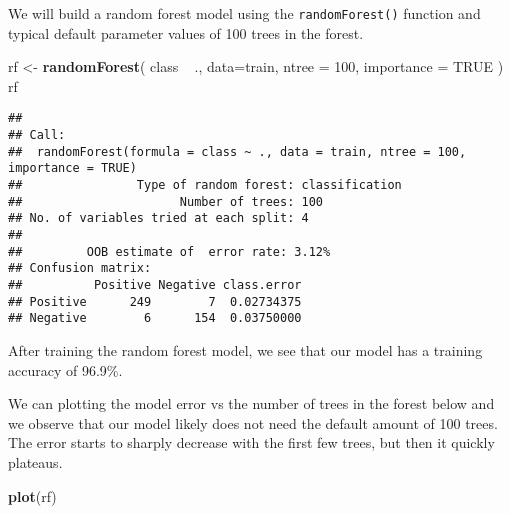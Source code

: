 \documentclass[
]{article}
\newenvironment{Shaded}{}{}
\newcommand{\DataTypeTok}[1]{\textcolor[rgb]{0.56,0.13,0.00}{#1}}
\newcommand{\DecValTok}[1]{\textcolor[rgb]{0.25,0.63,0.44}{#1}}
\newcommand{\KeywordTok}[1]{\textcolor[rgb]{0.00,0.44,0.13}{\textbf{#1}}}
\newcommand{\NormalTok}[1]{#1}
\newcommand{\OperatorTok}[1]{\textcolor[rgb]{0.40,0.40,0.40}{#1}}
\newcommand{\OtherTok}[1]{\textcolor[rgb]{0.00,0.44,0.13}{#1}}
\newcommand{\StringTok}[1]{\textcolor[rgb]{0.25,0.44,0.63}{#1}}
\begin{document}
We will build a random forest model using the \texttt{randomForest()}
function and typical default parameter values of 100 trees in the
forest.

\begin{Shaded}
\begin{Highlighting}[]
\NormalTok{rf <-}\StringTok{ }\KeywordTok{randomForest}\NormalTok{(}
\NormalTok{  class }\OperatorTok{~}\StringTok{ }\NormalTok{.,}
  \DataTypeTok{data=}\NormalTok{train,}
  \DataTypeTok{ntree =} \DecValTok{100}\NormalTok{,}
  \DataTypeTok{importance =} \OtherTok{TRUE}
\NormalTok{)}
\NormalTok{rf}
\end{Highlighting}
\end{Shaded}

\begin{verbatim}
## 
## Call:
##  randomForest(formula = class ~ ., data = train, ntree = 100,      importance = TRUE) 
##                Type of random forest: classification
##                      Number of trees: 100
## No. of variables tried at each split: 4
## 
##         OOB estimate of  error rate: 3.12%
## Confusion matrix:
##          Positive Negative class.error
## Positive      249        7  0.02734375
## Negative        6      154  0.03750000
\end{verbatim}

\begin{Shaded}
\end{Shaded}

After training the random forest model, we see that our model has a
training accuracy of 96.9\%.

We can plotting the model error vs the number of trees in the forest
below and we observe that our model likely does not need the default
amount of 100 trees. The error starts to sharply decrease with the first
few trees, but then it quickly plateaus.

\begin{Shaded}
\begin{Highlighting}[]
\KeywordTok{plot}\NormalTok{(rf)}
\end{Highlighting}
\end{Shaded}
\end{document}
